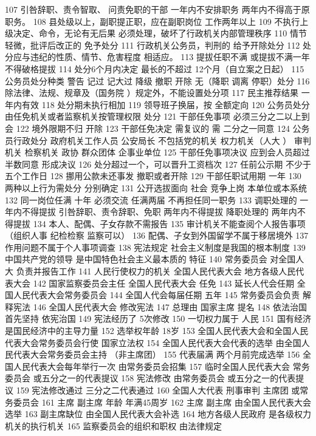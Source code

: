 \documentclass[11pt]{ctexart}
\begin{document}
107 引咎辞职、责令智取、 问责免职的干部
一年内不安排职务 两年内不得高于原职务。
108 县处级以上，副职提正职，应在副职岗位
工作两年以上
109 不执行上级决定、命令，无论有无后果
必须处理，破坏了行政机关内部管理秩序
110 情节轻微，批评后改正的
免予处分
111 行政机关公务员，判刑的
给予开除处分
112 处分应与违纪的性质、情节、危害程度 相适应。
113 提拔任职不满 或提拔不满一年 不得破格提拔
114 处分6个月内决定 最长的不超过
 12个月（自立案之日起）
115 公务员处分种类
警告 记过 记大过 降级 撤职 开除
无（降职 调离 停职）处分
116 除法律、法规、规章及（国务院 ）规定外，不能设置处分项
117 民主推荐结果 一年内有效
118 处分期未执行相加
119 领导班子换届，按
全额定向
120 公务员处分 由任免机关或者监察机关按管理权限 处分
121 干部任免事项
必须三分之二以上到会
122 境外限期不归
开除
123 干部任免决定 需复议的
需 二分之一同意
124 公务员行政处分
 政府机关工作人员 公安局长
不包括党的机关 权力机关（人大 ） 审判机关 检察机关 政协 群众团体 企事业单位
125 干部任免事项决议
应到会人员超过半数同意 形成决议
126 处分超过一个，可以晋升工资档次
127 任前公示期
不少于五个工作日
128 挪用公款未还事发
撤职或者开除
129 干部任职试用期
一年
130 两种以上行为需处分
分别确定
131 公开选拔面向 社会 竞争上岗 本单位或本系统
132 同一岗位任满
十年 必须交流 任满两届 不再担任同一职务
133 调职处理的 一年内不得提拔
引咎辞职、责令辞职、免职 两年内不得提拔
降职处理的 两年内不得提拔
134 本人、配偶、子女存款不需报告
135 审计机关不能查阅个人报告事项
（组织人事 纪检检察 监察可以）
136 配偶、子女到外国留学不属于移居境外
137 作用问题不属于个人事项调查
138 宪法规定 社会主义制度是我国的根本制度
139 中国共产党的领导 是中国特色社会主义最本质的 特征
140 常务委员会 对全国人大 负责并报告工作
141 人民行使权力的机关
全国人民代表大会 地方各级人民代表大会
142 国家监察委员会主任
全国人民代表大会 任免
143 延长人代会任期
全国人民代表大会常务委员会
144 全国人代会每届任期
 五年
145 常务委员会负责 解释宪法
146 全国人民代表大会 修改宪法
147 总理由 国家主席 提名
148 依法治国 首先坚持 依宪治国
149 宪法经历了
 5次修改
150 一切权力属于 人民
151 国有经济 是国民经济中的主导力量
152 选举权年龄
 18岁
153 全国人民代表大会和全国人民代表大会常务委员会行使 国家立法权
154 全国人民代表大会代表的选举
由全国人民代表大会常务委员会主持 （非主席团）
155 代表届满 两个月前完成选举
156 全国人民代表大会每年举行一次 由常务委员会招集
157 临时全国人民代表大会
常务委员会 或五分之一的代表提议
158 宪法修改
由常务委员会 或五分之一的代表提议
159 宪法修改通过
三分之二代表通过
160 全国人大代表 刑事审判
主席团 或常务委员会
161 主席 副主席 年龄
年满45周岁
162 主席 副主席
由全国人民代表大会选举
163 副主席缺位
由全国人民代表大会补选
164 地方各级人民政府 是各级权力机关的执行机关
165 监察委员会的组织和职权 由法律规定
\end{document}
